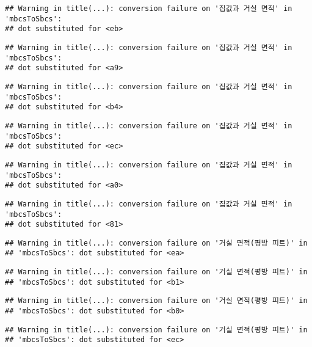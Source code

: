 \documentclass[
]{article}
\begin{document}
\begin{verbatim}
## Warning in title(...): conversion failure on '집값과 거실 면적' in 'mbcsToSbcs':
## dot substituted for <eb>
\end{verbatim}

\begin{verbatim}
## Warning in title(...): conversion failure on '집값과 거실 면적' in 'mbcsToSbcs':
## dot substituted for <a9>
\end{verbatim}

\begin{verbatim}
## Warning in title(...): conversion failure on '집값과 거실 면적' in 'mbcsToSbcs':
## dot substituted for <b4>
\end{verbatim}

\begin{verbatim}
## Warning in title(...): conversion failure on '집값과 거실 면적' in 'mbcsToSbcs':
## dot substituted for <ec>
\end{verbatim}

\begin{verbatim}
## Warning in title(...): conversion failure on '집값과 거실 면적' in 'mbcsToSbcs':
## dot substituted for <a0>
\end{verbatim}

\begin{verbatim}
## Warning in title(...): conversion failure on '집값과 거실 면적' in 'mbcsToSbcs':
## dot substituted for <81>
\end{verbatim}

\begin{verbatim}
## Warning in title(...): conversion failure on '거실 면적(평방 피트)' in
## 'mbcsToSbcs': dot substituted for <ea>
\end{verbatim}

\begin{verbatim}
## Warning in title(...): conversion failure on '거실 면적(평방 피트)' in
## 'mbcsToSbcs': dot substituted for <b1>
\end{verbatim}

\begin{verbatim}
## Warning in title(...): conversion failure on '거실 면적(평방 피트)' in
## 'mbcsToSbcs': dot substituted for <b0>
\end{verbatim}

\begin{verbatim}
## Warning in title(...): conversion failure on '거실 면적(평방 피트)' in
## 'mbcsToSbcs': dot substituted for <ec>
\end{verbatim}
\end{document}
